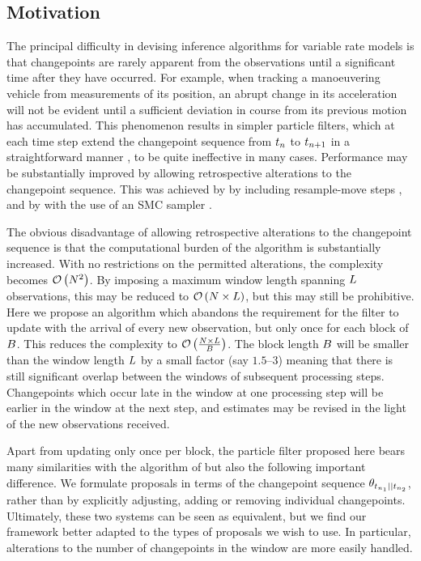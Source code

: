 \documentclass{article}
\begin{document}
\subsection{Motivation}

The principal difficulty in devising inference algorithms for variable rate models is that changepoints are rarely apparent from the observations until a significant time after they have occurred. For example, when tracking a manoeuvering vehicle from measurements of its position, an abrupt change in its acceleration will not be evident until a sufficient deviation in course from its previous motion has accumulated. This phenomenon results in simpler particle filters, which at each time step extend the changepoint sequence from $t_{n}$ to $t_{n+1}$ in a straightforward manner \citep{Godsill2004a,Godsill2007}, to be quite ineffective in many cases. Performance may be substantially improved by allowing retrospective alterations to the changepoint sequence. This was achieved by \citet{Bunch2013} by including resample-move steps \citep{Gilks2001}, and by \citet{Whiteley2011} with the use of an SMC sampler \citep{DelMoral2006,Doucet2006}.

The obvious disadvantage of allowing retrospective alterations to the changepoint sequence is that the computational burden of the algorithm is substantially increased. With no restrictions on the permitted alterations, the complexity becomes $\mathcal{O}\left({N^2}\right)$. By imposing a maximum window length spanning $L$ observations, this may be reduced to $\mathcal{O}\left({N \times L}\right)$, but this may still be prohibitive. Here we propose an algorithm which abandons the requirement for the filter to update with the arrival of every new observation, but only once for each block of $B$. This reduces the complexity to $\mathcal{O}\left({\frac{N \times L}{B}}\right)$. The block length $B$ will be smaller than the window length $L$ by a small factor (say $1.5$--$3$) meaning that there is still significant overlap between the windows of subsequent processing steps. Changepoints which occur late in the window at one processing step will be earlier in the window at the next step, and estimates may be revised in the light of the new observations received.

Apart from updating only once per block, the particle filter proposed here bears many similarities with the algorithm of \citet{Whiteley2011} but also the following important difference. We formulate proposals in terms of the changepoint sequence $\cp[\ot{\ti_1}]{\ot{\ti_2}}$, rather than by explicitly adjusting, adding or removing individual changepoints. Ultimately, these two systems can be seen as equivalent, but we find our framework better adapted to the types of proposals we wish to use. In particular, alterations to the number of changepoints in the window are more easily handled.
\end{document}
